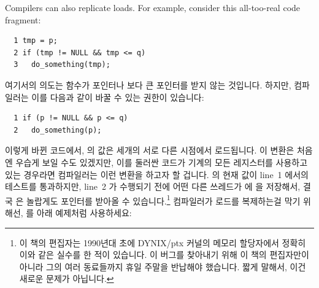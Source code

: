Compilers can also replicate loads.
For example, consider this all-too-real code fragment:
\fi

\vspace{5pt}
\begin{minipage}[t]{\columnwidth}
\scriptsize
\begin{verbatim}
  1 tmp = p;
  2 if (tmp != NULL && tmp <= q)
  3   do_something(tmp);
\end{verbatim}
\end{minipage}
\vspace{5pt}

여기서의 의도는  함수가  포인터나  보다 큰
포인터를 받지 않는 것입니다.
하지만, 컴파일러는 이를 다음과 같이 바꿀 수 있는 권한이 있습니다:

\vspace{5pt}
\begin{minipage}[t]{\columnwidth}
\scriptsize
\begin{verbatim}
  1 if (p != NULL && p <= q)
  2   do_something(p);
\end{verbatim}
\end{minipage}
\vspace{5pt}

이렇게 바뀐 코드에서,  의 값은 세개의 서로 다른 시점에서 로드됩니다.
이 변환은 처음엔 우습게 보일 수도 있겠지만, 이를 둘러싼 코드가 기계의 모든
레지스터를 사용하고 있는 경우라면 컴파일러는 이런 변환을 하고자 할 겁니다.
 의 현재 값이 line~1 에서의 테스트를 통과하지만, line~2 가 수행되기 전에
어떤 다른 쓰레드가  에  을 저장해서, 결국  은
놀랍게도  포인터를 받아올 수 있습니다.\footnote{
	이 책의 편집자는 1990년대 초에 DYNIX/ptx 커널의 메모리 할당자에서
	정확히 이와 같은 실수를 한 적이 있습니다.
	이 버그를 찾아내기 위해 이 책의 편집자만이 아니라 그의 여러 동료들까지
	휴일 주말을 반납해야 했습니다.
	짧게 말해서, 이건 새로운 문제가 아닙니다.}
컴파일러가 로드를 복제하는걸 막기 위해선,  를 아래 예제처럼
사용하세요:

